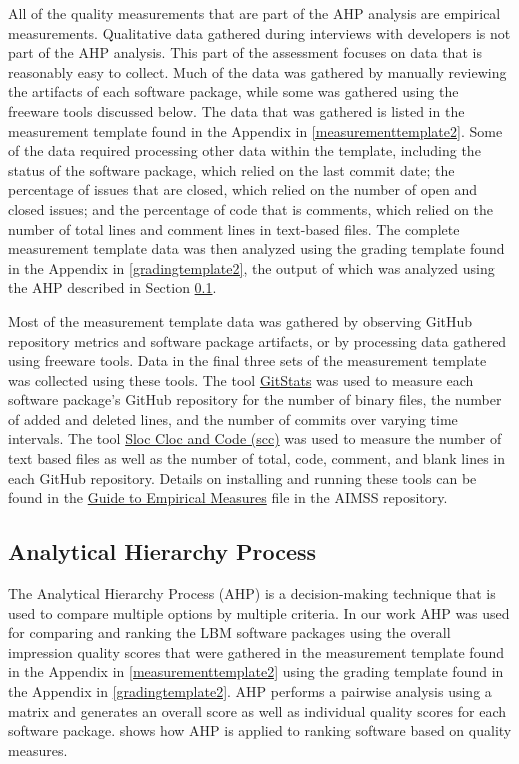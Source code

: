 \documentclass[12pt, notitlepage]{article}
\begin{document}
All of the quality measurements that are part of the AHP analysis are empirical measurements. Qualitative data gathered during interviews with developers is not part of the AHP analysis. This part of the assessment focuses on data that is reasonably easy to collect. Much of the data was gathered by manually reviewing the artifacts of each software package, while some was gathered using the freeware tools discussed below. The data that was gathered is listed in the measurement template found in the Appendix in \ref{measurementtemplate2}. Some of the data required processing other data within the template, including the status of the software package, which relied on the last commit date; the percentage of issues that are closed, which relied on the number of open and closed issues; and the percentage of code that is comments, which relied on the number of total lines and comment lines in text-based files. The complete measurement template data was then analyzed using the grading template found in the Appendix in \ref{gradingtemplate2}, the output of which was analyzed using the AHP described in Section \ref{AHP}.

Most of the measurement template data was gathered by observing GitHub repository metrics and software package artifacts, or by processing data gathered using freeware tools. Data in the final three sets of the measurement template was collected using these tools. The tool \href{https://github.com/tomgi/git_stats}{GitStats} was used to measure each software package's GitHub repository for the number of binary files, the number of added and deleted lines, and the number of commits over varying time intervals. The tool \href{https://github.com/boyter/scc}{Sloc Cloc and Code (scc)} was used to measure the number of text based files as well as the number of total, code, comment, and blank lines in each GitHub repository. Details on installing and running these tools can be found in the \href{https://github.com/smiths/AIMSS/blob/master/StateOfPractice/Methodology/A
	Guide to Empirical Measures.pdf} {Guide to Empirical Measures} file in the AIMSS repository. 

\subsection{Analytical Hierarchy Process}\label{AHP}

The Analytical Hierarchy Process (AHP) is a decision-making technique that is used to compare multiple options by multiple criteria. In our work AHP was used for comparing and ranking the LBM software packages using the overall impression quality scores that were gathered in the measurement template found in the Appendix in \ref{measurementtemplate2} using the grading template found in the Appendix in \ref{gradingtemplate2}. AHP performs a pairwise analysis using a matrix and generates an overall score as well as individual quality scores for each software package. \cite{SmithEtAl2016} shows how AHP is applied to ranking software based on quality measures. 
\end{document}
